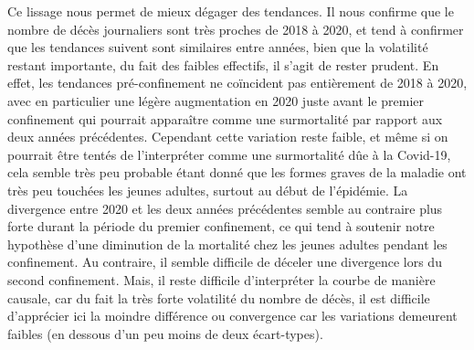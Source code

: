 \documentclass[titlepage]{article}
\begin{document}
Ce lissage nous permet de mieux dégager des tendances. Il nous confirme que le nombre de décès journaliers sont très proches de 2018 à 2020, et tend à confirmer que les tendances suivent sont similaires entre années, bien que la volatilité restant importante, du fait des faibles effectifs, il s'agit de rester prudent. En effet, les tendances pré-confinement ne coïncident pas entièrement de 2018 à 2020, avec en particulier une légère augmentation en 2020 juste avant le premier confinement qui pourrait apparaître comme une surmortalité par rapport aux deux années précédentes. Cependant cette variation reste faible, et même si on pourrait être tentés de l'interpréter comme une surmortalité dûe à la Covid-19, cela semble très peu probable étant donné que les formes graves de la maladie ont très peu touchées les jeunes adultes, surtout au début de l'épidémie. La divergence entre 2020 et les deux années précédentes semble au contraire plus forte durant la période du premier confinement, ce qui tend à soutenir notre hypothèse d'une diminution de la mortalité chez les jeunes adultes pendant les confinement. Au contraire, il semble difficile de déceler une divergence lors du second confinement. Mais, il reste difficile d'interpréter la courbe de manière causale, car du fait la très forte volatilité du nombre de décès, il est difficile d'apprécier ici la moindre différence ou convergence car les variations demeurent faibles (en dessous d'un peu moins de deux écart-types). \\


\end{document}
